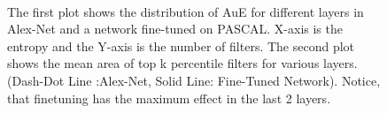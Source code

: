 \documentclass[runningheads]{llncs}
\begin{document}
\begin{figure}[H]
\centering
{}\\
\caption{The first plot shows the distribution of AuE for different layers in Alex-Net and a network fine-tuned on PASCAL. X-axis is the entropy and the Y-axis is the number of filters. The second plot shows the mean area of top k percentile filters for various layers. (Dash-Dot Line :Alex-Net, Solid Line: Fine-Tuned Network). Notice, that finetuning has the maximum effect in the last 2 layers.}
\label{fig:example}
\end{figure}
\end{document}
